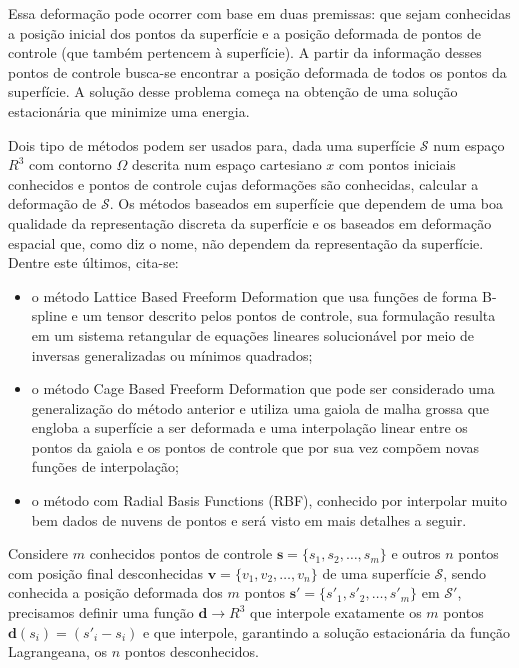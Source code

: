 Essa deformação pode ocorrer com base em duas premissas: que sejam conhecidas a posição inicial dos pontos da superfície e a posição deformada de pontos de controle (que também pertencem à superfície). A partir da informação desses pontos de controle busca-se encontrar a posição deformada de todos os pontos da superfície. A solução desse problema começa na obtenção de uma solução estacionária que minimize uma energia.\cite{Muller}

Dois tipo de métodos podem ser usados para, dada uma superfície $\mathcal{S}$ num espaço $R^3$ com contorno $\Omega$ descrita num espaço cartesiano $x$ com pontos iniciais conhecidos e pontos de controle cujas deformações são conhecidas, calcular a deformação de $\mathcal{S}$. Os métodos baseados em superfície que dependem de uma boa qualidade da representação discreta da superfície e os baseados em deformação espacial que, como diz o nome, não dependem da representação da superfície.\cite{Botsch} Dentre este últimos, cita-se: 

\renewcommand{\labelitemi}{•}
\begin{itemize}
  \item o método Lattice Based Freeform Deformation que usa funções de forma B-spline e um tensor descrito pelos pontos de controle, sua formulação resulta em um sistema retangular de equações lineares solucionável por meio de inversas generalizadas ou mínimos quadrados;
  \item o método Cage Based Freeform Deformation que pode ser considerado uma generalização do método anterior e utiliza uma gaiola de malha grossa que engloba a superfície a ser deformada e uma interpolação linear entre os pontos da gaiola e os pontos de controle que por sua vez compõem novas funções de interpolação;
  \item o método com Radial Basis Functions (RBF), conhecido por interpolar muito bem dados de nuvens de pontos e será visto em mais detalhes a seguir.
\end{itemize}

Considere $m$ conhecidos pontos de controle $\boldsymbol{s}=\{s_1, s_2, \ldots, s_m\}$ e outros $n$ pontos com posição final desconhecidas $\boldsymbol{v}=\{v_1, v_2, \ldots, v_n\}$ de uma superfície $\mathcal{S}$, sendo conhecida a posição deformada dos $m$ pontos $\boldsymbol{s'}=\{s'_1, s'_2, \ldots, s'_m\}$ em $\mathcal{S}'$, precisamos definir uma função $\boldsymbol{d}\to R^3$ que interpole exatamente os $m$ pontos $\boldsymbol{d}(s_i)=(s'_i-s_i)$ e que interpole, garantindo a solução estacionária da função Lagrangeana, os $n$ pontos desconhecidos.

